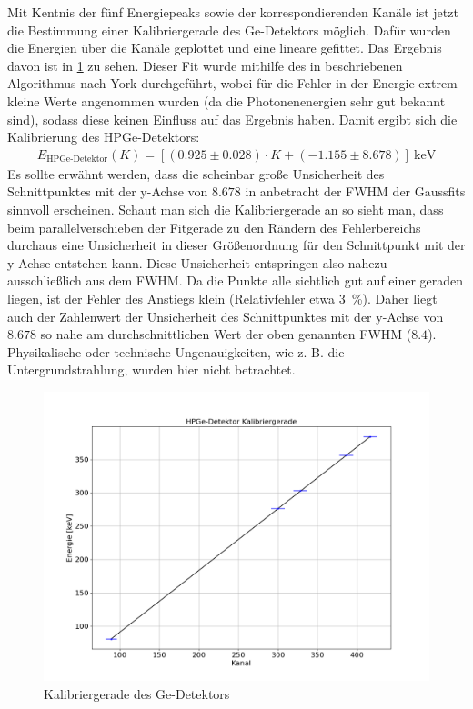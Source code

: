 Mit Kentnis der fünf Energiepeaks sowie der korrespondierenden Kanäle ist jetzt die Bestimmung einer Kalibriergerade des Ge-Detektors möglich.
Dafür wurden die Energien über die Kanäle geplottet und eine lineare gefittet.
Das Ergebnis davon ist in \ref{Gegerade} zu sehen.
Dieser Fit wurde mithilfe des in \cite{Fit_bivariate} beschriebenen Algorithmus nach York durchgeführt, wobei für die Fehler in der Energie extrem kleine Werte angenommen wurden (da die Photonenenergien sehr gut bekannt sind), sodass diese keinen Einfluss auf das Ergebnis haben.
Damit ergibt sich die Kalibrierung des HPGe-Detektors:
\begin{gather}
    E_{\text{HPGe-Detektor}} (K) = [(0.925 \pm 0.028) \cdot K + (-1.155 \pm 8.678)] \ \si{\kilo\electronvolt}
\end{gather}
Es sollte erwähnt werden, dass die scheinbar große Unsicherheit des Schnittpunktes mit der y-Achse von $8.678$ in anbetracht der FWHM der Gaussfits sinnvoll erscheinen.
Schaut man sich die Kalibriergerade an so sieht man, dass beim parallelverschieben der Fitgerade zu den Rändern des Fehlerbereichs durchaus eine Unsicherheit in dieser Größenordnung für den Schnittpunkt mit der y-Achse entstehen kann.
Diese Unsicherheit entspringen also nahezu ausschließlich aus dem FWHM.
Da die Punkte alle sichtlich gut auf einer geraden liegen, ist der Fehler des Anstiegs klein (Relativfehler etwa \SI{3}{\percent}).
Daher liegt auch der Zahlenwert der Unsicherheit des Schnittpunktes mit der y-Achse von $8.678$ so nahe am durchschnittlichen Wert der oben genannten FWHM ($8.4$).
Physikalische oder technische Ungenauigkeiten, wie z. B. die Untergrundstrahlung, wurden hier nicht betrachtet.

\begin{figure}[h!]
  \includegraphics[width=\linewidth]{images/Kalibriergerade1.png}
  \caption{Kalibriergerade des Ge-Detektors}
  \label{Gegerade}
\end{figure}
